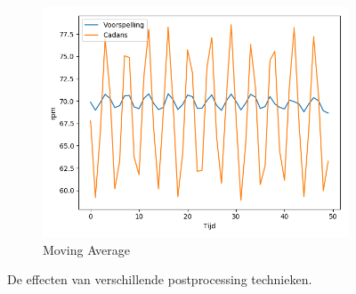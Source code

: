 \begin{figure}[t!]
\begin{subfigure}{.5\textwidth}
  \includegraphics[width=\linewidth]{images/actual-prediction+noice,ma.png}
  \caption{Moving Average}
  \label{fig:moving average postprocessing}
\end{subfigure}
\caption{De effecten van verschillende postprocessing technieken.}
\label{fig:effecten postprocessing}
\end{figure}


